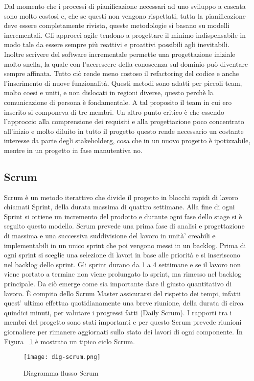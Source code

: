 Dal momento che i processi di pianificazione necessari ad uno sviluppo a cascata sono molto costosi e, che se questi non vengono rispettati, tutta la pianificazione deve essere completamente rivista, queste metodologie si basano su modelli incrementali. Gli approcci agile tendono a progettare il minimo indispensabile in modo tale da essere sempre più reattivi e proattivi possibili agli inevitabili. Inoltre scrivere del software incrementale permette una progettazione iniziale molto snella, la quale con l’accrescere della conoscenza sul dominio può diventare sempre affinata. Tutto ciò rende meno costoso il refactoring del codice e anche l’inserimento di nuove funzionalità. 
Questi metodi sono adatti per piccoli team, molto coesi e uniti, e non dislocati in regioni diverse, questo perchè la comunicazione di persona è fondamentale. A tal proposito il team in cui ero inserito si componeva di tre membri.
Un altro punto critico è che essendo l’approccio alla comprensione dei requisiti e alla progettazione poco concentrato all’inizio e molto diluito in tutto il progetto questo rende necessario un costante interesse da parte degli \gls{stakeholderg}, cosa che in un nuovo progetto è ipotizzabile, mentre in un progetto in fase manutentiva no.
\subsection{Scrum}
Scrum è un metodo iterattivo che divide il progetto in blocchi rapidi di lavoro chiamati
Sprint, della durata massima di quattro settimane. Alla fine di ogni Sprint si ottiene
un incremento del prodotto e durante ogni fase dello stage si è seguito questo modello. 
Scrum prevede una prima fase di analisi e progettazione di massima e una successiva suddivisione del lavoro in unità’ creabili e implementabili in un unico sprint che poi vengono messi in un backlog. Prima di ogni sprint si sceglie una selezione di lavori in base alle priorità e si inseriscono nel backlog dello sprint. Gli sprint durano da 1 a 4 settimane e se il lavoro non viene portato a termine non viene prolungato lo sprint, ma rimesso nel backlog principale. Da ciò emerge come sia importante dare il giusto quantitativo di lavoro. È compito dello
Scrum Master assicurarsi del rispetto dei tempi, infatti quest' ultimo effettua quotidianamente una breve
riunione, della durata di circa quindici minuti, per valutare i progressi fatti (Daily
Scrum). I rapporti tra i membri del progetto sono stati importanti e per questo Scrum prevede riunioni giornaliere per rimanere aggiornati sullo stato dei lavori di ogni componente.
In Figura ~\ref{fig:scrum} è mostrato un tipico ciclo Scrum.
\begin{figure}[!h]   
    \centering
    \texttt{[image: dig-scrum.png]} 
    \caption{Diagramma flusso Scrum}
    \label{fig:scrum} 
\end{figure}